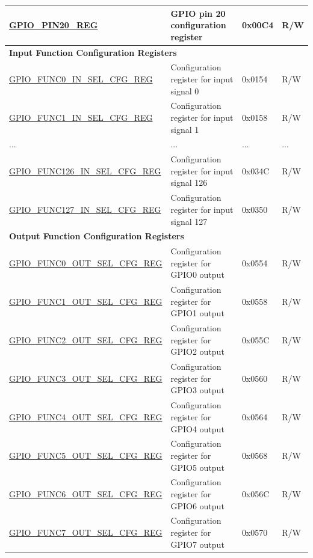 \begin{longtable}{ | p{6cm} | p{7.2cm} | p{1.3cm} | p{1cm} | }
\hyperref[regdesc:GPIOPINNREG]{GPIO\_PIN20\_REG} & GPIO pin 20 configuration register & 0x00C4 & R/W \\ \hline
\multicolumn{4}{|l|}{\textbf{Input Function Configuration Registers}} \\ \hline
\hyperref[regdesc:GPIOFUNCNINSELCFGREG]{GPIO\_FUNC0\_IN\_SEL\_CFG\_REG} & Configuration register for input signal 0 & 0x0154 & R/W \\ \hline
\hyperref[regdesc:GPIOFUNCNINSELCFGREG]{GPIO\_FUNC1\_IN\_SEL\_CFG\_REG} & Configuration register for input signal 1 & 0x0158 & R/W \\ \hline
...& ... & ... & ... \\ \hline
\hyperref[regdesc:GPIOFUNCNINSELCFGREG]{GPIO\_FUNC126\_IN\_SEL\_CFG\_REG} & Configuration register for input signal 126 & 0x034C & R/W \\ \hline
\hyperref[regdesc:GPIOFUNCNINSELCFGREG]{GPIO\_FUNC127\_IN\_SEL\_CFG\_REG} & Configuration register for input signal 127 & 0x0350 & R/W \\ \hline
\multicolumn{4}{|l|}{\textbf{Output Function Configuration Registers}} \\ \hline
\hyperref[regdesc:GPIOFUNCNOUTSELCFGREG]{GPIO\_FUNC0\_OUT\_SEL\_CFG\_REG} & Configuration register for GPIO0 output& 0x0554 & R/W \\ \hline
\hyperref[regdesc:GPIOFUNCNOUTSELCFGREG]{GPIO\_FUNC1\_OUT\_SEL\_CFG\_REG} & Configuration register for GPIO1 output & 0x0558 & R/W \\ \hline
\hyperref[regdesc:GPIOFUNCNOUTSELCFGREG]{GPIO\_FUNC2\_OUT\_SEL\_CFG\_REG} & Configuration register for GPIO2 output & 0x055C & R/W \\ \hline
\hyperref[regdesc:GPIOFUNCNOUTSELCFGREG]{GPIO\_FUNC3\_OUT\_SEL\_CFG\_REG} & Configuration register for GPIO3 output & 0x0560 & R/W \\ \hline
\hyperref[regdesc:GPIOFUNCNOUTSELCFGREG]{GPIO\_FUNC4\_OUT\_SEL\_CFG\_REG} & Configuration register for GPIO4 output & 0x0564 & R/W \\ \hline
\hyperref[regdesc:GPIOFUNCNOUTSELCFGREG]{GPIO\_FUNC5\_OUT\_SEL\_CFG\_REG} & Configuration register for GPIO5 output & 0x0568 & R/W \\ \hline
\hyperref[regdesc:GPIOFUNCNOUTSELCFGREG]{GPIO\_FUNC6\_OUT\_SEL\_CFG\_REG} & Configuration register for GPIO6 output & 0x056C & R/W \\ \hline
\hyperref[regdesc:GPIOFUNCNOUTSELCFGREG]{GPIO\_FUNC7\_OUT\_SEL\_CFG\_REG} & Configuration register for GPIO7 output & 0x0570 & R/W \\ \hline

\end{longtable}
